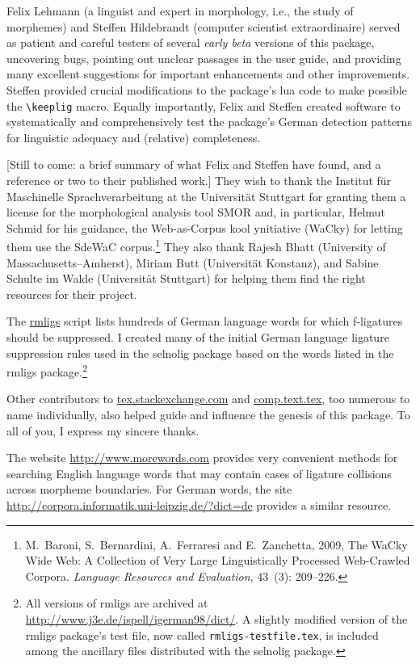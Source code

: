 \documentclass[12pt]{article}
\newcommand{\pkg}[1]{\textsf{#1}}
\newcommand{\opt}[1]{\texttt{#1}}
\newcommand{\cmmd}[1]{\texttt{\textbackslash #1}}
\begin{document}
Felix Lehmann (a linguist and expert in morphology, i.e., the study of morphemes) and Steffen Hildebrandt (computer scientist extraordinaire) served as patient and careful testers of several \emph{early beta} versions of this package, uncovering bugs, pointing out unclear passages in the user guide, and providing many excellent suggestions for important enhancements and other improvements. Steffen provided crucial modifications to the package's lua code to make possible the \cmmd{keeplig} macro. Equally importantly, Felix and Steffen created software to systematically and comprehensively test the package's German detection patterns for linguistic adequacy and (relative) completeness.

[Still to come: a brief summary of what Felix and Steffen have found, and a reference or two to their published work.] They wish to thank the Institut für Maschinelle Sprachverarbeitung at the Universität Stuttgart for granting them a license for the morphological analysis tool SMOR and, in particular, Helmut Schmid for his guidance, the Web-as-Corpus kool ynitiative (WaCky) for letting them use the SdeWaC corpus.\footnote{M.~Baroni, S.~Bernardini, A.~Ferraresi and E.~Zanchetta, 2009, The WaCky Wide Web: A Collection of Very Large Linguistically Processed Web-Crawled Corpora. \emph{Language Resources and Evaluation}, 43~(3): 209--226.} They also thank Rajesh Bhatt (University of Massachusetts--Amherst), Miriam Butt (Universität Konstanz), and Sabine Schulte im Walde (Universität Stuttgart) for helping them find the right resources for their project.

The \href{http://www.ctan.org/tex-archive/support/rmligs}{\pkg{rmligs}} script lists hundreds of German language words for which f\nobreak-liga\-tures should be suppressed. I created many of the initial German language ligature suppression rules used in the \pkg{selnolig} package based on the words listed in the \pkg{rmligs} package.\footnote{All versions of \pkg{rmligs} are archived at \url{http://www.j3e.de/ispell/igerman98/dict/}. A slightly modified version of the \pkg{rmligs} package's test file, now called \opt{rmligs-testfile.tex}, is included among the ancillary files distributed with the \pkg{selnolig} package.} 

Other contributors to \url{tex.stackexchange.com} and \url{comp.text.tex}, too numerous to name individually, also helped guide and influence the genesis of this package. To all of you, I express my sincere thanks.

The website \url{http://www.morewords.com} provides very convenient methods for searching English language words that may contain cases of ligature collisions across morpheme boundaries. For German words, the site  \url{http://corpora.informatik.uni-leipzig.de/?dict=de} provides a similar resource. 
\end{document}
